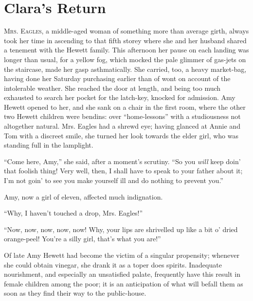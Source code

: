 \chapter{Clara's Return}

\textsc{Mrs. Eagles}, a middle-aged woman of something more than average
girth, always took her time in ascending to that fifth storey where she
and her husband shared a tenement with the Hewett family. This afternoon
her pause on each landing was longer than usual, for a yellow fog, which
mocked the pale glimmer of gas-jets on the staircase, made her gasp
asthmatically. She carried, too, a heavy market-bag, having done her
Saturday purchasing earlier than of wont on account of the intolerable
weather. She reached the door at length, and being too much exhausted to
search her pocket for the latch-key, knocked for admission. Amy Hewett
opened to her, and she sank on a chair in the first room, where the
other two Hewett children were bendins: over ``home-lessons'' with a
{\protect\hypertarget{291}{}{}}studiousness not altogether natural. Mrs.
Eagles had a shrewd eye; having glanced at Annie and Tom with a discreet
smile, she turned her look towards the elder girl, who was standing full
in the lamplight.

``Come here, Amy,'' she said, after a moment's scrutiny. ``So you
\emph{will} keep doin' that foolish thing! Very well, then, I shall have
to speak to your father about it; I'm not goin' to see you make yourself
ill and do nothing to prevent you.''

Amy, now a girl of eleven, affected much indignation.

``Why, I haven't touched a drop, Mrs. Eagles!''

``Now, now, now, now, now! Why, your lips are shrivelled up like a bit
o' dried orange-peel! You're a silly girl, that's what you are!''

Of late Amy Hewett had become the victim of a singular propensity;
whenever she could obtain vinegar, she drank it as a toper does spirits.
Inadequate nourishment, and especially an unsatisfied palate, frequently
have this result in female children among the poor;
{\protect\hypertarget{292}{}{}}it is an anticipation of what will befall
them as soon as they find their way to the public-house.

